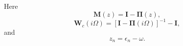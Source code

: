 Here
\begin{equation}
    \mathbf M(z)
    =
    \mathbf I-\boldsymbol{\Pi}(z),
\end{equation}
\begin{equation}
    \mathbf W_c(i\Omega)
    =
    \left[
    \mathbf I-\boldsymbol{\Pi}(i\Omega)
    \right]^{-1}
    -
    \mathbf I,
\end{equation}
and
\begin{equation}
    z_n=\epsilon_n-\omega.
\end{equation}













